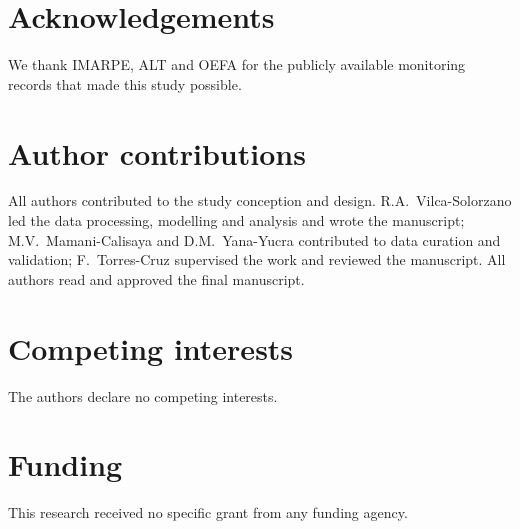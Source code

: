 \documentclass[11pt]{article}
\begin{document}
\section*{Acknowledgements}
We thank IMARPE, ALT and OEFA for the publicly available monitoring records that
made this study possible.

\section*{Author contributions}
All authors contributed to the study conception and design. R.A.~Vilca-Solorzano
led the data processing, modelling and analysis and wrote the manuscript;
M.V.~Mamani-Calisaya and D.M.~Yana-Yucra contributed to data curation and
validation; F.~Torres-Cruz supervised the work and reviewed the manuscript. All
authors read and approved the final manuscript.

\section*{Competing interests}
The authors declare no competing interests.

\section*{Funding}
This research received no specific grant from any funding agency.



\end{document}
